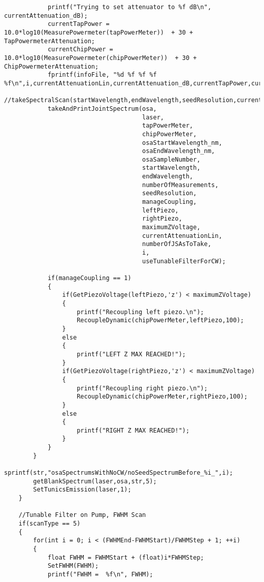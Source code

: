 \begin{lstlisting}
            printf("Trying to set attenuator to %f dB\n", currentAttenuation_dB);
            currentTapPower = 10.0*log10(MeasurePowermeter(tapPowerMeter))  + 30 + TapPowermeterAttenuation;
            currentChipPower = 10.0*log10(MeasurePowermeter(chipPowerMeter))  + 30 + ChipPowermeterAttenuation;
            fprintf(infoFile, "%d %f %f %f %f\n",i,currentAttenuationLin,currentAttenuation_dB,currentTapPower,currentChipPower);
            //takeSpectralScan(startWavelength,endWavelength,seedResolution,currentAttenuation_dB,chipPowerMeter,tapPowerMeter,laser);
            takeAndPrintJointSpectrum(osa,
                                      laser,
                                      tapPowerMeter,
                                      chipPowerMeter,
                                      osaStartWavelength_nm,
                                      osaEndWavelength_nm,
                                      osaSampleNumber,
                                      startWavelength,
                                      endWavelength,
                                      numberOfMeasurements,
                                      seedResolution,
                                      manageCoupling,
                                      leftPiezo,
                                      rightPiezo,
                                      maximumZVoltage,
                                      currentAttenuationLin,
                                      numberOfJSAsToTake,
                                      i,
                                      useTunableFilterForCW);

            if(manageCoupling == 1)
            {
                if(GetPiezoVoltage(leftPiezo,'z') < maximumZVoltage)
                {
                    printf("Recoupling left piezo.\n");
                    RecoupleDynamic(chipPowerMeter,leftPiezo,100);
                }
                else
                {
                    printf("LEFT Z MAX REACHED!");
                }
                if(GetPiezoVoltage(rightPiezo,'z') < maximumZVoltage)
                {
                    printf("Recoupling right piezo.\n");
                    RecoupleDynamic(chipPowerMeter,rightPiezo,100);
                }
                else
                {
                    printf("RIGHT Z MAX REACHED!");
                }
            }
        }
        sprintf(str,"osaSpectrumsWithNoCW/noSeedSpectrumBefore_%i_",i);
        getBlankSpectrum(laser,osa,str,5);
        SetTunicsEmission(laser,1);
    }

    //Tunable Filter on Pump, FWHM Scan
    if(scanType == 5)
    {
        for(int i = 0; i < (FWHMEnd-FWHMStart)/FWHMStep + 1; ++i)
        {
            float FWHM = FWHMStart + (float)i*FWHMStep;
            SetFWHM(FWHM);
            printf("FWHM =  %f\n", FWHM);


\end{lstlisting}
